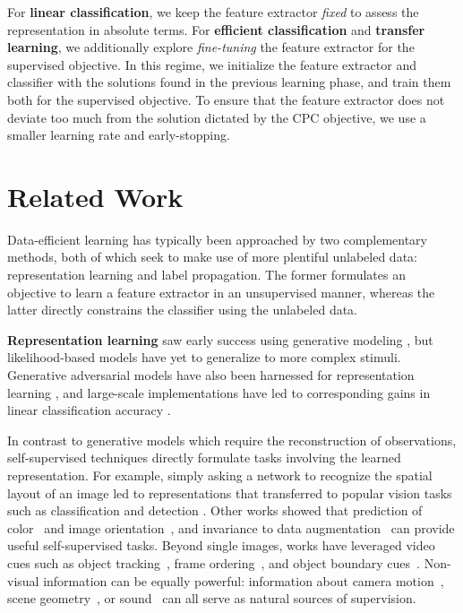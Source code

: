 \documentclass{article}
\begin{document}
For \textbf{linear classification}, we keep the feature extractor  \textit{fixed} to assess the representation in absolute terms. For \textbf{efficient classification} and \textbf{transfer learning}, we additionally explore \textit{fine-tuning} the feature extractor for the supervised objective. In this regime, we initialize the feature extractor and classifier with the solutions  found in the previous learning phase, and train them both for the supervised objective. To ensure that the feature extractor does not deviate too much from the solution dictated by the CPC objective, we use a smaller learning rate and early-stopping.

\section{Related Work}

Data-efficient learning has typically been approached by two complementary methods, both of which seek to make use of more plentiful unlabeled data: representation learning and label propagation. The former formulates an objective to learn a feature extractor  in an unsupervised manner, whereas the latter directly constrains the classifier  using the unlabeled data. 

\textbf{Representation learning} saw early success using generative modeling \citep{kingma2014semi}, but likelihood-based models have yet to generalize to more complex stimuli. Generative adversarial models have also been harnessed for representation learning \citep{donahue2016adversarial}, and large-scale implementations have led to corresponding gains in linear classification accuracy \citep{donahue2019large}.

In contrast to generative models which require the reconstruction of observations, self-supervised techniques directly formulate tasks involving the learned representation. For example, simply asking a network to recognize the spatial layout of an image led to representations that transferred to popular vision tasks such as classification and detection \citep{doersch2015unsupervised,noroozi2016unsupervised}. Other works showed that prediction of color~\citep{zhang2016colorful,larsson2017colorization} and image orientation~\citep{gidaris2018unsupervised}, and invariance to data augmentation~\citep{dosovitskiy2014discriminative} can provide useful self-supervised tasks. Beyond single images, works have leveraged video cues such as object tracking~\citep{wang2015unsupervised}, frame ordering~\citep{misra2016shuffle}, and object boundary cues~\citep{li2016unsupervised,pathak2016learning}. Non-visual information can be equally powerful: information about camera motion~\citep{agrawal2015learning,jayaraman2015learning}, scene geometry~\citep{zamir2016generic}, or sound~\citep{arandjelovic2017look,arandjelovic2018objects} can all serve as natural sources of supervision.
\end{document}
